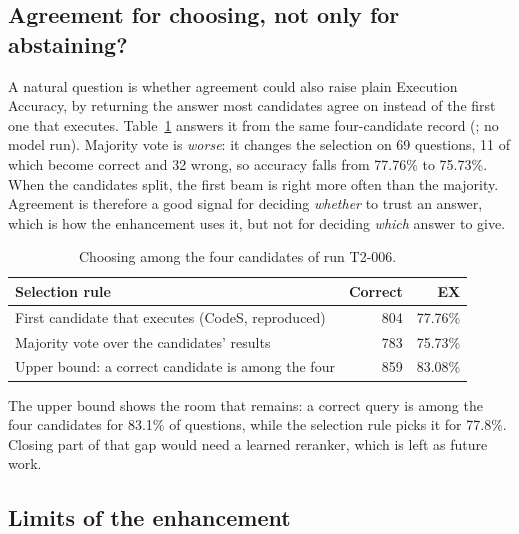 \subsection{Agreement for choosing, not only for abstaining?}

A natural question is whether agreement could also raise plain Execution Accuracy, by returning the answer most candidates agree on instead of the first one that executes. Table~\ref{tab:select} answers it from the same four-candidate record (; no model run). Majority vote is \emph{worse}: it changes the selection on 69 questions, 11 of which become correct and 32 wrong, so accuracy falls from 77.76\% to 75.73\%. When the candidates split, the first beam is right more often than the majority. Agreement is therefore a good signal for deciding \emph{whether} to trust an answer, which is how the enhancement uses it, but not for deciding \emph{which} answer to give.

\begin{table}[!t]
	\centering
	\caption{Choosing among the four candidates of run T2-006.}
	\label{tab:select}
	\begin{tabular}{|l|r|r|}
		\hline
		\textbf{Selection rule} & \textbf{Correct} & \textbf{EX} \\ \hline
		First candidate that executes (CodeS, reproduced) & 804 & 77.76\% \\ \hline
		Majority vote over the candidates' results & 783 & 75.73\% \\ \hline
		Upper bound: a correct candidate is among the four & 859 & 83.08\% \\ \hline
	\end{tabular}
\end{table}

The upper bound shows the room that remains: a correct query is among the four candidates for 83.1\% of questions, while the selection rule picks it for 77.8\%. Closing part of that gap would need a learned reranker, which is left as future work.

\subsection{Limits of the enhancement}

